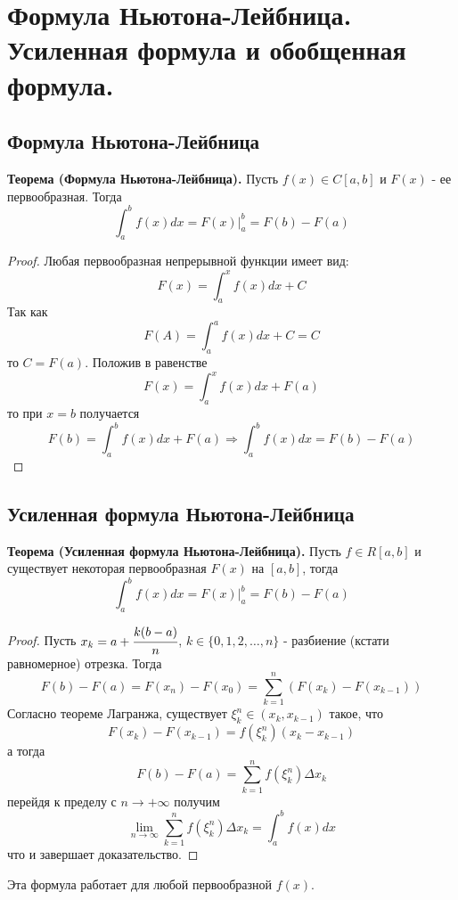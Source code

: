 \documentclass{article}
\newcommand*{\limToInf}[2]{\displaystyle \lim_{#1 \to \infty} #2}
\newcommand*{\theorem}[2]{\textbf{Теорема #1. } #2 \newline}
\newcommand*{\cf}[2]{\cfrac{#1}{#2}}
\newcommand*{\D}{\Delta}
\begin{document}
\section{Формула Ньютона-Лейбница. Усиленная формула и обобщенная формула.}
\subsection{Формула Ньютона-Лейбница}
\theorem{(Формула Ньютона-Лейбница)}{Пусть $f(x) \in C[a, b]$ и $F(x)$ - ее первообразная. Тогда}
$$
    \int_{a}^{b} f(x)dx = F(x)\Bigr|_{a}^{b} = F(b) - F(a)
$$  
\begin{proof}
    Любая первообразная непрерывной функции имеет вид: 
    $$
        F(x) = \int_{a}^{x} f(x)dx + C
    $$
    Так как 
    $$
        F(A) = \int_{a}^{a} f(x)dx + C = C
    $$
    то $C = F(a)$. Положив в равенстве
    $$
        F(x) = \int_{a}^{x} f(x)dx + F(a)
    $$
    то при $x = b$ получается 
    $$
        F(b) = \int_{a}^{b} f(x)dx + F(a) \Rightarrow \int_{a}^{b} f(x)dx = F(b) - F(a)
    $$
\end{proof}
\subsection{Усиленная формула Ньютона-Лейбница}
\theorem{(Усиленная формула Ньютона-Лейбница)}{Пусть $f \in R[a, b]$ и существует некоторая первообразная $F(x)$ на $[a, b]$, тогда}
$$
    \int_{a}^{b} f(x)dx = F(x)\Bigr|_{a}^{b} = F(b) - F(a)
$$
\begin{proof}
    Пусть $x_k = a + \cf{k(b - a)}{n}$, $k \in \{ 0, 1, 2, \dots, n \}$ - разбиение (кстати равномерное) отрезка. Тогда 
    $$
        F(b) - F(a) = F(x_n) - F(x_0) = \sum_{k = 1}^{n} (F(x_k) - F(x_{k - 1}))
    $$
    Согласно теореме Лагранжа, существует $\xi^n_k \in (x_k, x_{k - 1})$ такое, что
    $$
        F(x_k) - F(x_{k - 1}) = f(\xi_k^n)(x_k - x_{k - 1})
    $$
    а тогда 
    $$
        F(b) - F(a) = \sum_{k = 1}^{n} f(\xi_k^n)\D x_k
    $$
    перейдя к пределу с $n \to +\infty$ получим
    $$
        \limToInf{n}{\sum_{k = 1}^{n}f(\xi_k^n)\D x_k} = \int_{a}^{b}f(x)dx
    $$
    что и завершает доказательство.
\end{proof}
Эта формула работает для любой первообразной $f(x)$.
\end{document}
